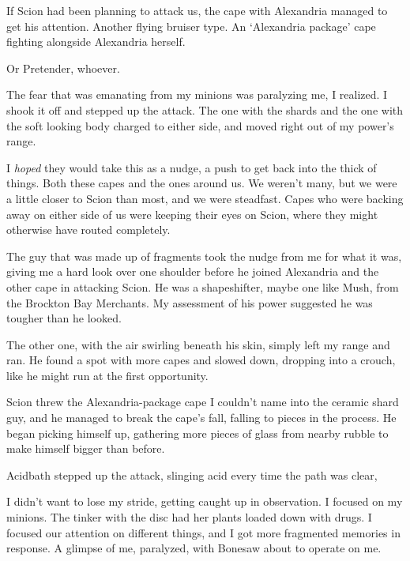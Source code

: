 If Scion had been planning to attack us, the cape with Alexandria managed to get his attention.  Another flying bruiser type.  An `Alexandria package' cape fighting alongside Alexandria herself.



Or Pretender, whoever.



The fear that was emanating from my minions was paralyzing me, I realized.  I shook it off and stepped up the attack.  The one with the shards and the one with the soft looking body charged to either side, and moved right out of my power's range.



I \emph{hoped} they would take this as a nudge, a push to get back into the thick of things.  Both these capes and the ones around us.  We weren't many, but we were a little closer to Scion than most, and we were steadfast.  Capes who were backing away on either side of us were keeping their eyes on Scion, where they might otherwise have routed completely.



The guy that was made up of fragments took the nudge from me for what it was, giving me a hard look over one shoulder before he joined Alexandria and the other cape in attacking Scion.  He was a shapeshifter, maybe one like Mush, from the Brockton Bay Merchants.  My assessment of his power suggested he was tougher than he looked.



The other one, with the air swirling beneath his skin, simply left my range and ran.  He found a spot with more capes and slowed down, dropping into a crouch, like he might run at the first opportunity.



Scion threw the Alexandria-package cape I couldn't name into the ceramic shard guy, and he managed to break the cape's fall, falling to pieces in the process.  He began picking himself up, gathering more pieces of glass from nearby rubble to make himself bigger than before.



Acidbath stepped up the attack, slinging acid every time the path was clear,



I didn't want to lose my stride, getting caught up in observation.  I focused on my minions.  The tinker with the disc had her plants loaded down with drugs.  I focused our attention on different things, and I got more fragmented memories in response.  A glimpse of me, paralyzed, with Bonesaw about to operate on me.



